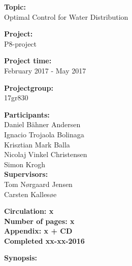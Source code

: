 \begin{minipage}[t]{0.48\textwidth}
\textbf{Topic:} \\[5pt]\bigskip\hspace{2ex}
Optimal Control for Water Distribution

\textbf{Project:} \\[5pt]\bigskip\hspace{2ex}
P8-project

\textbf{Project time:} \\[5pt]\bigskip\hspace{2ex}
February 2017 - May 2017

\textbf{Projectgroup:} \\[5pt]\bigskip\hspace{2ex}
17gr830	

\textbf{Participants:} \\[5pt]\hspace*{2ex}
Daniel Bähner Andersen \\\hspace*{2ex}
Ignacio Trojaola Bolinaga \\\hspace*{2ex} 
Krisztian Mark Balla \\\hspace*{2ex}
Nicolaj Vinkel Christensen \\\hspace*{2ex}
Simon Krogh \\

\textbf{Supervisors:} \\[5pt]\hspace*{2ex}
Tom Nørgaard Jensen \\\hspace*{2ex}
Carsten Kallesøe \\\bigskip\hspace{2ex}

\vspace*{3.5cm}

\textbf{Circulation: x} \\
\textbf{Number of pages: x}\\
\textbf{Appendix: x + CD} \\
\textbf{Completed xx-xx-2016}\\
\end{minipage}
\hfill
\begin{minipage}[t]{0.483\textwidth}
\textbf{Synopsis:} \\[5pt]
\fbox{\parbox{7cm}{\bigskip\bigskip}}
\end{minipage}

\vfill